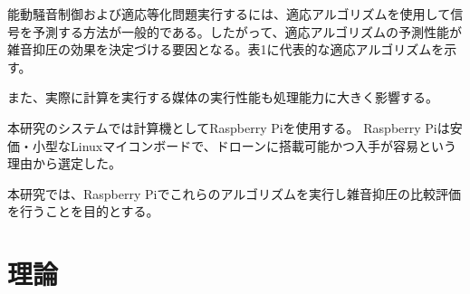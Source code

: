 \documentclass[a4paper, twocolumn]{ltjsarticle}
\begin{document}
  能動騒音制御および適応等化問題実行するには、適応アルゴリズムを使用して信号を予測する方法が一般的である。したがって、適応アルゴリズムの予測性能が雑音抑圧の効果を決定づける要因となる。表1に代表的な適応アルゴリズムを示す。

  また、実際に計算を実行する媒体の実行性能も処理能力に大きく影響する。

  本研究のシステムでは計算機としてRaspberry Piを使用する。
  Raspberry Piは安価・小型なLinuxマイコンボードで、ドローンに搭載可能かつ入手が容易という理由から選定した。
  
  本研究では、Raspberry Piでこれらのアルゴリズムを実行し雑音抑圧の比較評価を行うことを目的とする。

  



\section{理論}
\end{document}
